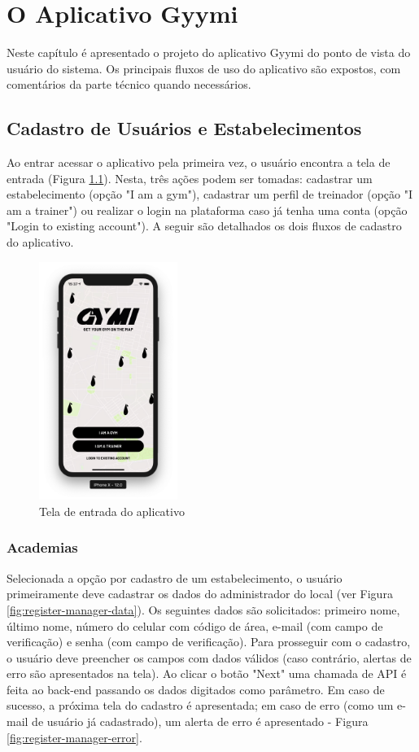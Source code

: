 \chapter{O Aplicativo Gyymi} \label{cap:gyymi}
Neste capítulo é apresentado o projeto do aplicativo Gyymi do ponto de vista do usuário do sistema. Os principais fluxos de uso do aplicativo são expostos, com comentários da parte técnico quando necessários.

\section{Cadastro de Usuários e Estabelecimentos}
Ao entrar acessar o aplicativo pela primeira vez, o usuário encontra a tela de entrada (Figura \ref{fig:landing}). Nesta, três ações podem ser tomadas: cadastrar um estabelecimento (opção "I am a gym"), cadastrar um perfil de treinador (opção "I am a trainer") ou realizar o login na plataforma caso já tenha uma conta (opção "Login to existing account"). A seguir são detalhados os dois fluxos de cadastro do aplicativo.
\begin{figure}[H]
    \centering
    \includegraphics[width=0.4\textwidth]{pfc/figuras/landing.png}
    \caption{Tela de entrada do aplicativo}
    \label{fig:landing}
\end{figure}

\subsection{Academias} \label{sec:register-gym}
Selecionada a opção por cadastro de um estabelecimento, o usuário primeiramente deve cadastrar os dados do administrador do local (ver Figura \ref{fig:register-manager-data}). Os seguintes dados são solicitados: primeiro nome, último nome, número do celular com código de área, e-mail (com campo de verificação) e senha (com campo de verificação). Para prosseguir com o cadastro, o usuário deve preencher os campos com dados válidos (caso contrário, alertas de erro são apresentados na tela). Ao clicar o botão "Next" uma chamada de API é feita ao back-end passando os dados digitados como parâmetro. Em caso de sucesso, a próxima tela do cadastro é apresentada; em caso de erro (como um e-mail de usuário já cadastrado), um alerta de erro é apresentado - Figura \ref{fig:register-manager-error}.


